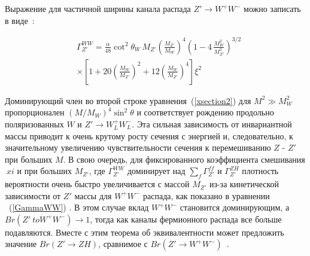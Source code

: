Выражение для частичной ширины канала распада $ Z '\to W ^ + W ^ - $ можно записать в виде~\cite{2part-pankov}:

\begin{align}
&\Gamma_{Z'}^{WW}=\frac{\alpha}{48}\cot^2\theta_W\, M_{Z'}
\left(\frac{M_{Z'}}{M_W}\right)^4\left(1-4\,\frac{M_W^2}{M_{Z'}^2}\right)^{3/2} \nonumber \\
& \times \left[ 1+20 \left(\frac{M_W}{M_{Z'}}\right)^2 + 12
\left(\frac{M_W}{M_{Z'}}\right)^4\right]\xi^2 \label{GammaWW}
\end{align}

Доминирующий член во второй строке уравнения~(\ref{xsection2}) для $ M ^ 2 \gg M_W ^ 2 $ пропорционален $ (M / M_W) ^ 4 \sin ^ 2 \theta $ и соответствует рождению продольно поляризованных $ W $ и $ Z'\to W^+_LW^-_L $. Эта сильная зависимость от инвариантной массы приводит к очень крутому росту сечения с энергией и, следовательно, к значительному увеличению чувствительности сечения к перемешиванию $ Z $ - $ Z '$ при больших $ M $. В свою очередь, для фиксированного коэффициента смешивания $ \ xi $ и при больших $ M_ {Z '} $, где $ \Gamma_ {Z'} ^ {WW} $ доминирует над $ \sum_f \Gamma_ {Z '} ^ {ff } $ и $ \Gamma_ {Z '} ^ {ZH} $ плотность вероятности очень быстро увеличивается с массой $ M_ {Z'} $ из-за кинетической зависимости от $ Z '$ массы для $ W ^ + W ^ - $ распада, как показано в уравнении ~(\ref{GammaWW})
\cite{2part-pankov}. В этом случае вклад $ W ^ + W ^ - $ становится доминирующим, а $ {Br} (Z '\ to W ^ + W ^ -) \to 1 $, тогда как каналы фермионного распада все больше подавляются. Вместе с этим теорема об эквивалентности может предложить значение $ {Br} (Z'\to ZH) $, сравнимое с $ {Br} (Z' \to W ^ + W ^ -) $~\cite{2part-pankov}.